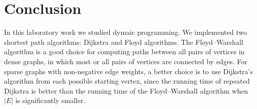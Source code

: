 \documentclass{article}
\begin{document}
	\section{Conclusion}
		\par In this laboratory work we studied dymaic programming. We implemented two shortest path algorithms: Dijkstra and Floyd algorithms. The Floyd–Warshall algorithm is a good choice for computing paths between all pairs of vertices in dense graphs, in which most or all pairs of vertices are connected by edges. For sparse graphs with non-negative edge weights, a better choice is to use Dijkstra's algorithm from each possible starting vertex, since the running time of repeated Dijkstra is better than the running time of the Floyd–Warshall algorithm when \(|E|\) is significantly smaller.
\end{document}
